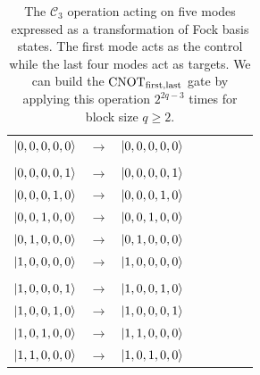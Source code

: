 \documentclass[aps,pra,twocolumn,superscriptaddress,floatfix,10pt]{revtex4}
\begin{document}
\begin {table}[h]
\begin{center}
	\begin{tabular}{l*{6}{c}r} 
		$\ket{0,0,0,0,0}$  &  $\rightarrow$ & $\ket{0,0,0,0,0}$ \\ \\
		$\ket{0,0,0,0,1}$  & $\rightarrow$ & $\ket{0,0,0,0,1}$ \\
		$\ket{0,0,0,1,0}$ & $\rightarrow$ & $\ket{0,0,0,1,0}$ \\
		$\ket{0,0,1,0,0}$ & $\rightarrow$ & $\ket{0,0,1,0,0} $ \\ 
		$\ket{0,1,0,0,0}$ & $\rightarrow$ & $\ket{0,1,0,0,0} $\\
		$\ket{1,0,0,0,0}$ & $\rightarrow$ & $\ket{1,0,0,0,0} $ \\ \\
		$\ket{1,0,0,0,1}$  & $\rightarrow$ & $\ket{1,0,0,1,0}$ \\
		$\ket{1,0,0,1,0}$  & $\rightarrow$ & $\ket{1,0,0,0,1}$ \\
		$\ket{1,0,1,0,0}$  & $\rightarrow$ & $\ket{1,1,0,0,0}$ \\
		$\ket{1,1,0,0,0}$  & $\rightarrow$ & $\ket{1,0,1,0,0}$ \\
	\end{tabular}
	\caption{ \label{One Control Four Targets} The $\mathcal{C}_3$ operation acting on five modes expressed as a transformation of Fock basis states. The first mode acts as the control while the last four modes act as targets. We can build the $\mbox{CNOT}_{\rm first,last}$ gate by applying this operation $2^{2 q - 3}$ times for block size $q \ge 2$.}
\end{center}
\end{table}
\end{document}
